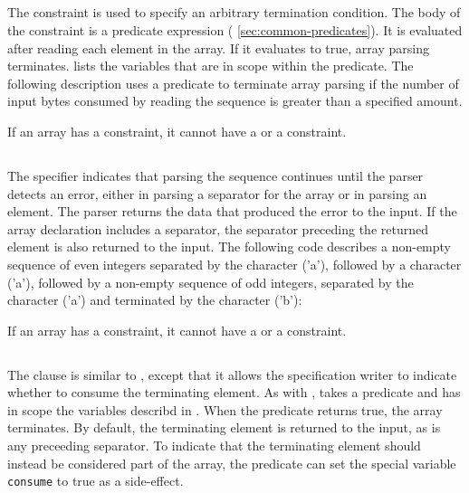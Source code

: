 

\subsection{\Plast}
The \Plast{} constraint is used to specify an arbitrary termination
condition.  The body of the constraint is a predicate expression (\cf{}
\ref{sec:common-predicates}).  It is evaluated after reading each
element in the array.  If it evaluates to true, array parsing
terminates.  lists the variables that
are in scope within the predicate.
The following description uses a \Plast{} predicate to 
terminate array parsing if the number of input bytes consumed by
reading the sequence is greater than a specified amount.

%
\noindent
If an array has a \Plast{} constraint, it cannot have a
\Plongest{} or a \Pended{} constraint.


\subsection{\Plongest{}}
The \Plongest{} specifier indicates that parsing the sequence continues
until the parser detects an error, either in parsing a separator for the
array or in parsing an element. The parser returns the data that
produced the
error to the input.  If the array declaration includes a
separator, the separator preceding the returned element
is also returned to the input.  The following \pads{} code describes a
non-empty sequence of even integers separated by the character
\cd('a'), followed by a character \cd('a'), followed by a non-empty
sequence of odd integers, separated by the character \cd('a') and
terminated by the character \cd('b'):

%
\noindent
If an array has a \Plongest{} constraint, it cannot have a
\Plast{} or a \Pended{} constraint.


\subsection{\Pended}
The \Pended{} clause is similar to \Plast{}, except that it allows 
the specification writer to indicate whether to consume the terminating
element.   As with \Plast{}, \Pended{} takes a predicate and has in
scope the variables describd in .  When the
predicate returns true, the array terminates.  By default, the
terminating element is returned to the input, as is any preceeding
separator.  To indicate that the terminating element should 
instead be considered part of the array, the predicate can set the
special variable \texttt{consume} to true as a side-effect. 

